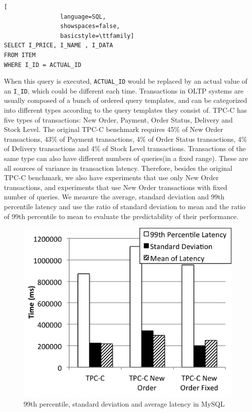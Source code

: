 \begin{lstlisting}[
                language=SQL,
                showspaces=false,
                basicstyle=\ttfamily]
SELECT I_PRICE, I_NAME , I_DATA
FROM ITEM
WHERE I_ID = ACTUAL_ID
\end{lstlisting}

When this query is executed, \texttt{ACTUAL\_ID} would be replaced by an actual
value of an \texttt{I\_ID}, which could be different each time. Transactions in
OLTP systems are usually composed of a bunch of ordered query templates,
and can be categorized into different types according to the query templates
they consist of. TPC-C has five types of transactions: New Order, Payment,
Order Status, Delivery and Stock Level. The original TPC-C benchmark requires
45\% of New Order transactions, 43\% of Payment transactions, 4\% of Order
Status transactions, 4\% of Delivery transactions and 4\% of Stock Level
transactions. Transactions of the same type can also have different numbers of
queries(in a fixed range). These are all sources of variance in transaction
latency. Therefore, besides the original TPC-C benchmark, we also have
experiments that use only New Order transactions, and experiments that use New
Order transactions with fixed number of queries. We measure the average,
standard deviation and 99th percentile latency and use the ratio of standard
deviation to mean and the ratio of 99th percentile to mean to evaluate the
predictability of their performance.

\begin{figure}[h]
\centering
\includegraphics[scale=0.7]{plots/mysql-var}
\caption{99th percentile, standard deviation and average latency in MySQL}
\label{fig:mysql-var}
\end{figure}

